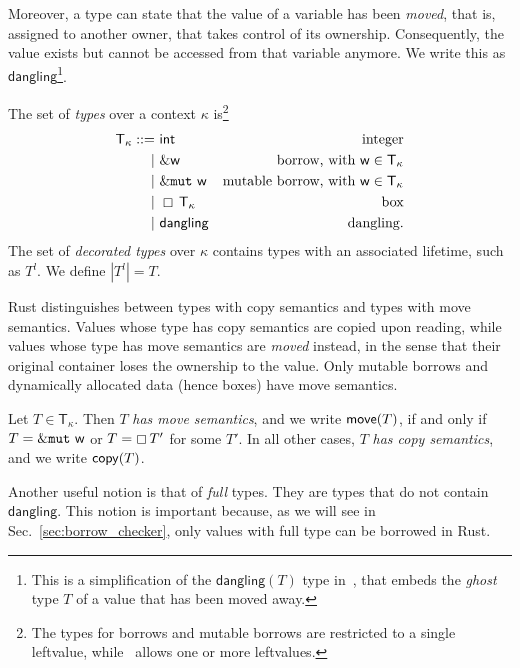 Moreover, a type can state that the value of a variable
has been \emph{moved}, that is, assigned
to another owner, that takes control of its ownership.
Consequently, the value exists but cannot be accessed from that variable anymore.
We write this as $\mathsf{dangling}$\footnote{This is a simplification of the
$\mathsf{dangling}(T)$ type in~\cite{Pearce21}, that embeds
the \emph{ghost} type $T$ of a value that has been moved away.}.

\begin{definition}[Types]
  The set of \emph{types} over a context $\kappa$
  is\footnote{The types for borrows and mutable borrows are restricted to a single leftvalue,
    while~\cite{Pearce21} allows one or more leftvalues.}
  \begin{align*}
    \mathsf{T}_\kappa ::=&\ \mathsf{int} & \text{integer}\\
    | &\ \&\mathsf{w} & \text{borrow, with $\mathsf{w}\in\mathsf{T}_\kappa$}\\
    | &\ \&\mathtt{mut}\ \mathsf{w} & \text{mutable borrow, with $\mathsf{w}\in\mathsf{T}_\kappa$}\\
    | &\ \boxempty\,{\mathsf{T}_\kappa} & \text{box}\\
    | &\ \mathsf{dangling} & \text{dangling}.
  \end{align*}
  The set of \emph{decorated types} over $\kappa$ contains types with an
  associated lifetime, such as $T^l$. We define $|T^l|=T$.
\end{definition}

Rust distinguishes between types with copy semantics
and types with move semantics.
Values whose type has copy semantics
are copied upon reading, while values whose type has
move semantics are \emph{moved} instead, in the sense that their original container
loses the ownership to the value. Only mutable borrows and dynamically
allocated data (hence boxes) have move semantics.

\begin{definition}\label{def:copy_move}
  Let $T\in\mathsf{T}_\kappa$. Then $T$ \emph{has move semantics}, and we write
  $\mathsf{move}(T)$, if and only if $T=\&\mathtt{mut}\ \mathsf{w}$ or
  $T=\boxempty\,{T'}$ for some $T'$. In all other cases, $T$ \emph{has copy semantics},
  and we write $\mathsf{copy}(T)$.
\end{definition}

Another useful notion is that of \emph{full} types. They are types that do not contain
$\mathsf{dangling}$. This notion is important because, as we will see
in Sec.~\ref{sec:borrow_checker}, only values with full type can be borrowed in Rust.

